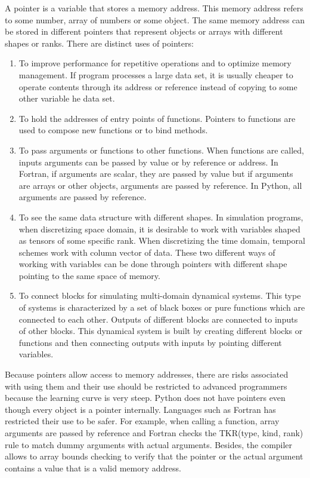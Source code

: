 A pointer is a variable that stores a memory address. 
This memory address refers to some number, array of numbers or some object. 
The same memory address can be stored in different pointers that represent  
objects or arrays with different shapes or ranks. 
There are  distinct uses of pointers: 
\begin{enumerate}
\item To improve performance for repetitive operations and to optimize memory management. 
If program processes a large data set, it is usually cheaper to operate contents through 
its address or reference instead of copying to some other variable he data set. 
\item To hold the addresses of entry points of functions. Pointers to functions 
are used to compose new functions or to bind methods. 
\item To pass arguments or functions to other functions.
When functions are called, inputs arguments can be passed by value or by reference or address. 
In Fortran, if arguments are scalar, they are passed by value but if arguments are arrays or other objects, 
arguments are passed by reference. 
In Python, all arguments are passed by reference. 
\item To see the same data structure  with different shapes. 
In simulation programs, when discretizing space domain, 
it is desirable to work  with variables shaped as tensors of some specific rank. 
When discretizing the time domain, temporal schemes work with column vector of data. 
These two different ways of working with variables can be done through pointers with different shape pointing to
the same space of memory. 
\item To connect blocks for simulating multi-domain dynamical systems. 
This type of systems is characterized by a set of black boxes or pure functions which are connected to 
each other. Outputs of different blocks are connected to inputs of other blocks. 
This dynamical system is built by creating different blocks or functions and then  
connecting outputs with inputs by pointing different variables. 

\end{enumerate}
Because pointers allow access to memory addresses, 
there are risks associated with using them and their use should be restricted to advanced 
programmers because the learning curve is very steep. 
Python does not have pointers even though every object is a pointer internally. 
Languages such as Fortran has restricted their use to be safer. For example, 
when calling a function, array arguments are passed by reference and
Fortran checks the TKR(type, kind, rank) rule to match dummy arguments with actual 
arguments. Besides, the compiler allows to array bounds checking
to verify that the pointer or the actual argument contains 
a value that is a valid memory address.


